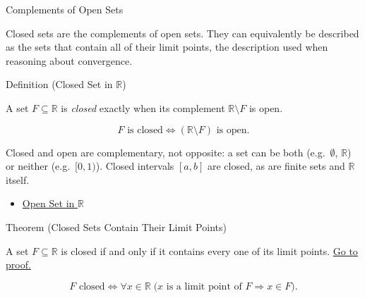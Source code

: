 \label{sec:closed-sets}

\begin{topicbox}{Complements of Open Sets}
\begin{exposition}
Closed sets are the complements of open sets. They can equivalently be described as the sets that contain all of their limit points, the description used when reasoning about convergence.
\end{exposition}
\end{topicbox}
\begin{definitionbox}{Definition (Closed Set in $\mathbb{R}$)}
\begin{definition}
\label{def:closed-set}
A set $F\subseteq\mathbb{R}$ is \emph{closed} exactly when its complement $\mathbb{R}\setminus F$ is open.
\end{definition}
\end{definitionbox}
\begin{remark*}
\[
F \text{ is closed} \Longleftrightarrow (\mathbb{R}\setminus F) \text{ is open}.
\]
\end{remark*}
\begin{remark*}[Interpretation]
Closed and open are complementary, not opposite: a set can be both (e.g.\ $\emptyset$, $\mathbb{R}$) or neither (e.g.\ $[0,1)$). Closed intervals $[a,b]$ are closed, as are finite sets and $\mathbb{R}$ itself.
\end{remark*}
\begin{dependencies}
\begin{itemize}
  \item \hyperref[def:open-set]{Open Set in $\mathbb{R}$}
\end{itemize}
\end{dependencies}
\begin{theorembox}{Theorem (Closed Sets Contain Their Limit Points)}
\begin{theorem}
\label{thm:closed-iff-contains-limit-points}
A set $F\subseteq\mathbb{R}$ is closed if and only if it contains every one of its limit points.
\hyperref[prf:closed-iff-contains-limit-points]{Go to proof.}
\end{theorem}
\end{theorembox}
\begin{remark*}
\[
F \text{ closed} \Longleftrightarrow \forall x\in\mathbb{R}\;\bigl(x \text{ is a limit point of } F \Rightarrow x\in F\bigr).
\]
\end{remark*}

